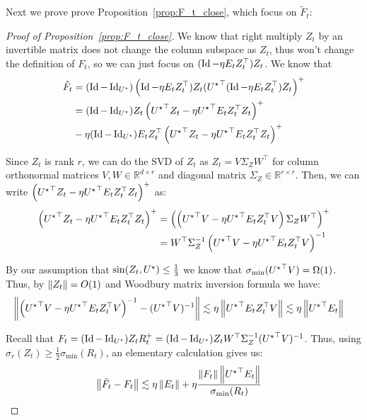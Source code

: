 \noindent Next we prove prove Proposition~\ref{prop:F_t_close}, which focus on $\tilde{F}_t$:
\begin{proof}[Proof of Proposition~\ref{prop:F_t_close}]

We know that right multiply $Z_t 
$ by an invertible matrix does not change the column subspace as $Z_t$, thus won't change the definition of $F_t$, so we can just focus on $ (\operatorname{Id} -  \eta E_t Z_t^{\top})Z_t $. 
We know that 
\begin{align*}
\tilde{F}_t &= (\operatorname{Id}- \operatorname{Id}_{{{U}^\star}}) \left(\operatorname{Id} -  \eta E_t Z_t^{\top})Z_t ({{U}^\star}^{\top} (\operatorname{Id} -  \eta E_t Z_t^{\top})Z_t\right)^{+}
\\
 &= (\operatorname{Id}- \operatorname{Id}_{{{U}^\star}}) Z_t \left({{U}^\star}^{\top} Z_t - \eta {{U}^\star}^{\top} E_t Z_t^{\top} Z_t \right)^{+}
 \\
 & - \eta  (\operatorname{Id}- \operatorname{Id}_{{{U}^\star}})E_t Z_t^{\top}\left({{U}^\star}^{\top} Z_t - \eta {{U}^\star}^{\top} E_t Z_t^{\top} Z_t \right)^{+}
\end{align*}


Since $Z_t$ is rank $r$, we can do the SVD of $Z_t$ as $Z_t =  V \Sigma_Z W^{\top}$ for column orthonormal matrices $V, W \in \mathbb{R}^{d \times r}$ and diagonal matrix $\Sigma_Z \in \mathbb{R}^{r \times r}$. Then, we can write $\left({{U}^\star}^{\top} Z_t - \eta {{U}^\star}^{\top} E_t Z_t^{\top} Z_t \right)^{+}$ as:
\begin{align*}
\left({{U}^\star}^{\top} Z_t - \eta {{U}^\star}^{\top} E_t Z_t^{\top} Z_t \right)^{+} &= \left(\left({{U}^\star}^{\top} V- \eta {{U}^\star}^{\top} E_t Z_t^{\top}V \right) \Sigma_Z W^{\top} \right)^{+}
\\
&=  W^{\top} \Sigma_Z^{-1} \left( {{U}^\star}^{\top}V - \eta {{U}^\star}^{\top}  {E}_t Z_t^{\top} V\right)^{-1}
\end{align*}


By our assumption that $\sin(Z_t, {{U}^\star}) \leq \frac{1}{3}$ we know that $\sigma_{\min}({{U}^\star}^{\top} V) = \Omega(1)$. Thus, by $\left\|Z_t\right\| = O(1)$ and Woodbury matrix inversion formula we have:
\begin{align*}
\left\|\left( {{U}^\star}^{\top}V - \eta {{U}^\star}^{\top}  {E}_t Z_t^{\top} V\right)^{-1} -  ({{U}^\star}^{\top}V )^{-1} \right\| &\lesssim  \eta \left\|{{U}^\star}^{\top}  {E}_t Z_t^{\top} V\right\| \lesssim \eta \left\|{{U}^\star}^{\top}  {E}_t\right\|
\end{align*}




Recall that $F_t  = (\operatorname{Id} - \operatorname{Id}_{{{U}^\star}}) Z_t R_t^+ = (\operatorname{Id} - \operatorname{Id}_{{{U}^\star}}) Z_t W^{\top} \Sigma_Z^{-1} ({{U}^\star}^{\top} {V})^{-1} $. Thus, using $\sigma_{r}(Z_t) \geq \frac{1}{2} \sigma_{\min} (R_t)$, an elementary calculation gives us:
\begin{align*}
\left\|\tilde{F}_t - F_t\right\| &\lesssim \eta \left\|E_t\right\| + \eta \frac{ \left\|F_t\right\| \left\|{{U}^\star}^{\top} E_t \right\| }{\sigma_{\min}(R_t)}
\end{align*}


\end{proof}
